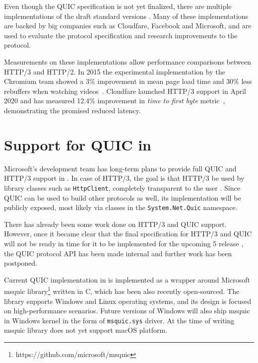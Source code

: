 
Even though the QUIC specification is not yet finalized, there are multiple implementations of the
draft standard versions . Many of these
implementations are backed by big companies such as Cloudfare, Facebook and Microsoft, and are used
to evaluate the protocol specification and research improvements to the protocol.

Measurements on these implementations allow performance comparisons between HTTP/3 and HTTP/2. In
2015 the experimental implementation by the Chromium team showed a 3\% improvement in mean page load
time and 30\% less rebuffers when watching videos~\cite{Wilk2015}. Cloudfare launched HTTP/3 support
in April 2020 and has measured 12.4\% improvement in \textit{time to first byte}
metric~\cite{Tellakula2020}, demonstrating the promised reduced latency.

\section{Support for QUIC in \dotnet{}}

Microsoft's development team has long-term plans to provide full QUIC and HTTP/3 support in \dotnet{}.
In case of HTTP/3, the goal is that HTTP/3 be used by library classes such as \texttt{HttpClient},
completely transparent to the user . Since QUIC can be used to build other protocols as well, its
implementation will be publicly exposed, most likely via classes in the \texttt{System.Net.Quic}
namespace.

There has already been some work done on HTTP/3 and QUIC support. However, once it became clear that
the final specification for HTTP/3 and QUIC will not be ready in time for it to be implemented for
the upcoming \dotnet{} 5 release , the QUIC protocol API has been made internal and further work has
been postponed.




Current QUIC implementation in \dotnet{} is implemented as a wrapper around Microsoft msquic
library\footnote{https://github.com/microsoft/msquic}  written in C, which has been also recently
open-sourced. The library supports Windows and Linux operating systems, and its design is focused on
high-performance scenarios. Future versions of Windows will also ship msquic in  Windows kernel in
the form of \texttt{msquic.sys} driver. At the time of writing  msquic
library does not yet support macOS platform.

